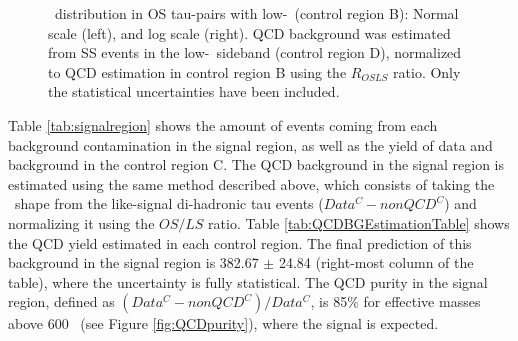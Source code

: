  \begin{figure}[ht]
 \begin{center}
 \captionsetup[subfloat]{farskip=0pt,captionskip=0.0cm,labelformat=empty}
 \end{center}
 \caption{\mass~distribution in OS tau-pairs with low-\MET~(control region B): Normal scale (left),
 and log scale (right). QCD background was estimated from SS events in the 
 low-\MET~sideband (control region D), normalized to QCD estimation in control region B 
 using the $R_{OSLS}$ ratio. Only the statistical uncertainties have been included.}
  \label{fig:CR_B}
 \end{figure}
 
\noindent Table \ref{tab:signalregion} shows the amount of events coming from each
background contamination in the signal region, as well as the yield of 
data and background in the control region C. The QCD background in the signal 
region is estimated using the same method described above, which consists of taking the \mass~shape
from the like-signal di-hadronic tau events ($Data^{C} - nonQCD^{C}$) and normalizing
it using the $OS/LS$ ratio. Table \ref{tab:QCDBGEstimationTable} shows the QCD yield estimated 
in each control region. The final prediction of this background in the signal region 
is 382.67 $\pm$ 24.84 (right-most column of the table), where the uncertainty
is fully statistical. The QCD purity in the signal region, 
defined as $(Data^{C}-nonQCD^{C})/Data^{C}$, is 85$\%$ for effective 
masses above 600 \GeV~(see Figure \ref{fig:QCDpurity}), where 
the signal is expected.\\

